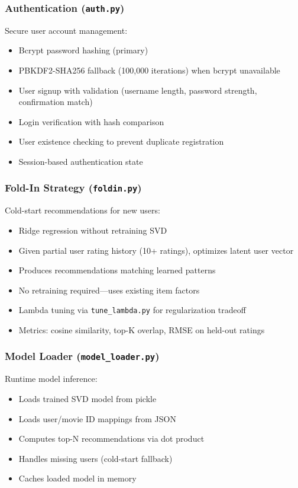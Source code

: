 \documentclass[11pt,a4paper]{article}
\begin{document}
\subsubsection{Authentication (\texttt{auth.py})}

Secure user account management:

\begin{itemize}
    \item Bcrypt password hashing (primary)
    \item PBKDF2-SHA256 fallback (100,000 iterations) when bcrypt unavailable
    \item User signup with validation (username length, password strength, confirmation match)
    \item Login verification with hash comparison
    \item User existence checking to prevent duplicate registration
    \item Session-based authentication state
\end{itemize}

\subsubsection{Fold-In Strategy (\texttt{foldin.py})}

Cold-start recommendations for new users:

\begin{itemize}
    \item Ridge regression without retraining SVD
    \item Given partial user rating history (10+ ratings), optimizes latent user vector
    \item Produces recommendations matching learned patterns
    \item No retraining required—uses existing item factors
    \item Lambda tuning via \texttt{tune\_lambda.py} for regularization tradeoff
    \item Metrics: cosine similarity, top-K overlap, RMSE on held-out ratings
\end{itemize}

\subsubsection{Model Loader (\texttt{model\_loader.py})}

Runtime model inference:

\begin{itemize}
    \item Loads trained SVD model from pickle
    \item Loads user/movie ID mappings from JSON
    \item Computes top-N recommendations via dot product
    \item Handles missing users (cold-start fallback)
    \item Caches loaded model in memory
\end{itemize}
\end{document}
